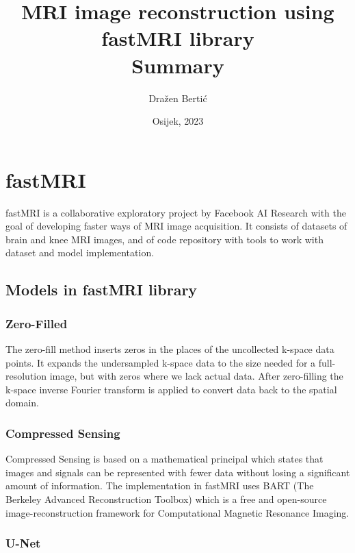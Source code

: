 \documentclass[10pt,a4paper]{article}
\begin{document}
\title{MRI image reconstruction using fastMRI library \\ \vspace{0.5cm} \large Summary}
\author{Dražen Bertić}
\date{Osijek, 2023} %

\maketitle

\section{fastMRI}

fastMRI is a collaborative exploratory project by Facebook AI Research with the goal of developing faster ways of MRI image acquisition. It consists of datasets of brain and knee MRI images, and of code repository with tools to work with dataset and model implementation.

\subsection{Models in fastMRI library}

\subsubsection{Zero-Filled}

The zero-fill method inserts zeros in the places of the uncollected k-space data points. It expands the undersampled k-space data to the size needed for a full-resolution image, but with zeros where we lack actual data. After zero-filling the k-space inverse Fourier transform is applied to convert data back to the spatial domain.

\subsubsection{Compressed Sensing}

Compressed Sensing is based on a mathematical principal which states that images and signals can be represented with fewer data without losing a significant amount of information. The implementation in fastMRI uses BART (The Berkeley Advanced Reconstruction Toolbox) which is a free and open-source image-reconstruction framework for Computational Magnetic Resonance Imaging. 

\subsubsection{U-Net}
\end{document}
